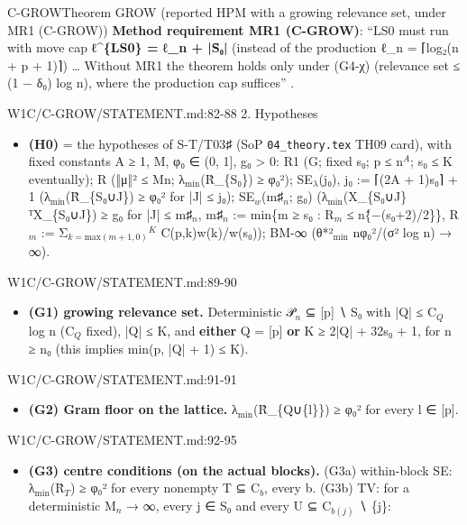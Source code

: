 \begin{card}{C-GROW}{Theorem GROW (reported HPM with a growing relevance set, under MR1 (C-GROW))}
\textbf{Method requirement MR1 (C-GROW)}: ``LS0 must run with move cap \textbf{ℓ\textasciicircum{}\{LS0\} = ℓ\_n + |S̃₀|} (instead of the production ℓ\_n = ⌈log₂(n + p + 1)⌉) \ldots{} Without MR1 the theorem holds only under (G4-χ) (relevance set ≤ (1 − δ₀) log n), where the production cap suffices'' .
\begin{stmt}{W1C/C-GROW/STATEMENT.md:82-88}
2. Hypotheses
\begin{itemize}
\item \textbf{(H0)} = the hypotheses of S-T/T03♯ (SoP \texttt{04\_theory.tex} TH09 card), with fixed constants A ≥ 1, M, φ₀ ∈ (0, 1],
g₀ > 0: R1 (G; fixed s₀; p ≤ n$^{A}$; s₀ ≤ K eventually); R (‖μ‖² ≤ Mn; λ$_{\mathrm{min}}$(R̂\_\{S₀\})  ≥ φ₀²); SE$_{\lambda}$(j₀),
j₀ := ⌈(2A + 1)s₀⌉ + 1 (λ$_{\mathrm{min}}$(R̂\_\{S₀∪J\}) ≥ φ₀² for |J| ≤ j₀); SE$_{w}$(m♯$_{n}$; g₀) (λ$_{\mathrm{min}}$(X\_\{S₀∪J\}ᵀX\_\{S₀∪J\}) ≥ g₀ for
|J| ≤ m♯$_{n}$, m♯$_{n}$ := min\{m ≥ s₀ : R$_{m}$ ≤ n\^\{−(s₀+2)/2\}\}, R$_{m}$ := Σ$_{k=\mathrm{max}(m+1,0)}$$^{K}$ C(p,k)w(k)/w(s₀)); BM-∞
(θ*²$_{\mathrm{min}}$ nφ₀²/(σ² log n) → ∞).
\end{itemize}
\end{stmt}
\begin{stmt}{W1C/C-GROW/STATEMENT.md:89-90}
\begin{itemize}
\item \textbf{(G1) growing relevance set.} Deterministic 𝒫$_{n}$ ⊆ [p] ∖ S₀ with |Q| ≤ C$_{Q}$ log n (C$_{Q}$ fixed), |Q| ≤ K, and
\textbf{either} Q = [p] \textbf{or} K ≥ 2|Q| + 32s₀ + 1, for n ≥ n₀ (this implies min(p, |Q| + 1) ≤ K).
\end{itemize}
\end{stmt}
\begin{stmt}{W1C/C-GROW/STATEMENT.md:91-91}
\begin{itemize}
\item \textbf{(G2) Gram floor on the lattice.} λ$_{\mathrm{min}}$(R̂\_\{Q∪\{l\}\}) ≥ φ₀² for every l ∈ [p].
\end{itemize}
\end{stmt}
\begin{stmt}{W1C/C-GROW/STATEMENT.md:92-95}
\begin{itemize}
\item \textbf{(G3) centre conditions (on the actual blocks).} (G3a) within-block SE: λ$_{\mathrm{min}}$(R̂$_{T}$) ≥ φ₀² for every nonempty
T ⊆ C$_{b}$, every b. (G3b) TV: for a deterministic M$_{n}$ → ∞, every j ∈ S₀ and every U ⊆ C$_{b(j)}$ ∖ \{j\}:

\end{itemize}
\end{stmt}
\end{card}
